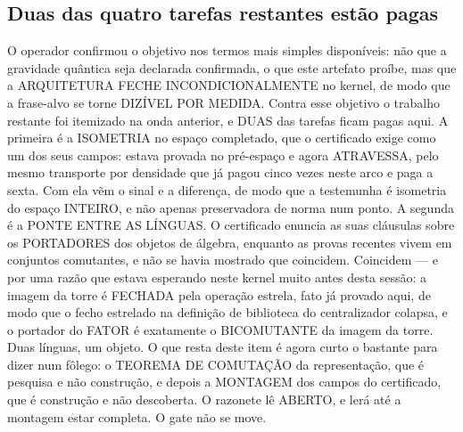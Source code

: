 \documentclass[11pt]{article}
\theoremstyle{definition}\newtheorem{deriv}{Derivação}
\begin{document}
\subsection*{Duas das quatro tarefas restantes est\~ao pagas}O operador confirmou o objetivo nos termos mais simples dispon\'iveis: n\~ao que a gravidade qu\^antica seja declarada confirmada, o que este artefato pro\'ibe, mas que a ARQUITETURA FECHE INCONDICIONALMENTE no kernel, de modo que a frase-alvo se torne DIZ\'IVEL POR MEDIDA. Contra esse objetivo o trabalho restante foi itemizado na onda anterior, e DUAS das tarefas ficam pagas aqui. A primeira \'e a ISOMETRIA no espa\c{c}o completado, que o certificado exige como um dos seus campos: estava provada no pr\'e-espa\c{c}o e agora ATRAVESSA, pelo mesmo transporte por densidade que j\'a pagou cinco vezes neste arco e paga a sexta. Com ela v\~em o sinal e a diferen\c{c}a, de modo que a testemunha \'e isometria do espa\c{c}o INTEIRO, e n\~ao apenas preservadora de norma num ponto. A segunda \'e a PONTE ENTRE AS L\'INGUAS. O certificado enuncia as suas cl\'ausulas sobre os PORTADORES dos objetos de \'algebra, enquanto as provas recentes vivem em conjuntos comutantes, e n\~ao se havia mostrado que coincidem. Coincidem --- e por uma raz\~ao que estava esperando neste kernel muito antes desta sess\~ao: a imagem da torre \'e FECHADA pela opera\c{c}\~ao estrela, fato j\'a provado aqui, de modo que o fecho estrelado na defini\c{c}\~ao de biblioteca do centralizador colapsa, e o portador do FATOR \'e exatamente o BICOMUTANTE da imagem da torre. Duas l\'inguas, um objeto. O que resta deste item \'e agora curto o bastante para dizer num f\^olego: o TEOREMA DE COMUTA\c{C}\~AO da representa\c{c}\~ao, que \'e pesquisa e n\~ao constru\c{c}\~ao, e depois a MONTAGEM dos campos do certificado, que \'e constru\c{c}\~ao e n\~ao descoberta. O razonete l\^e ABERTO, e ler\'a at\'e a montagem estar completa. O gate n\~ao se move.
\end{document}
